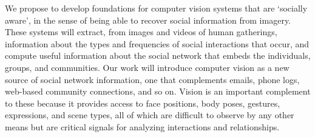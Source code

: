 

We propose to develop foundations for computer vision systems that are `socially aware', in the sense of being able to recover social information from imagery. These systems will extract, from images and videos of human gatherings,  information about the types and frequencies of social interactions that occur, and compute useful information about the social network that embeds the individuals, groups, and communities.  Our work will introduce computer vision as a new source of social network information, one that complements emails, phone logs, web-based community connections, and so on. Vision is an important complement to these because it provides access to face positions, body poses, gestures, expressions, and scene types, all of which are difficult to observe by any other means but are critical signals for analyzing interactions and relationships. 



